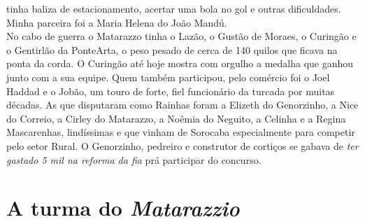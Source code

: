 \documentclass[12pt,brazil,]{book}
\begin{document}
tinha baliza de estacionamento, acertar uma bola no gol e outras
dificuldades. Minha parceira foi a Maria Helena do João Mandú.\\
No cabo de guerra o Matarazzo tinha o Lazão, o Gustão de Moraes, o
Curingão e o Gentirlão da PonteArta, o peso pesado de cerca de 140
quilos que ficava na ponta da corda. O Curingão até hoje mostra com
orgulho a medalha que ganhou junto com a sua equipe. Quem também
participou, pelo comércio foi o Joel Haddad e o Jobão, um touro de
forte, fiel funcionário da turcada por muitas décadas. As que disputaram
como Rainhas foram a Elizeth do Genorzinho, a Nice do Correio, a Cirley
do Matarazzo, a Noêmia do Neguito, a Celinha e a Regina Mascarenhas,
lindíssimas e que vinham de Sorocaba especialmente para competir pelo
setor Rural. O Genorzinho, pedreiro e construtor de cortiços se gabava
de \emph{ter gastado 5 mil na reforma da fia} prá participar do
concurso.

\section{\texorpdfstring{A turma do
\emph{Matarazzio}}{A turma do Matarazzio}}\label{a-turma-do-matarazzio}
\end{document}
